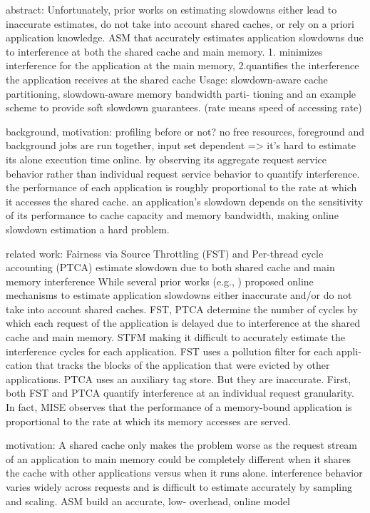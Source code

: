 \documentclass[UTF8]{article}
\begin{document}
abstract: Unfortunately, prior works on estimating slowdowns either lead to inaccurate estimates, do not take into account shared caches, or rely on a priori application knowledge. ASM that accurately estimates application slowdowns due to interference at both the shared cache and main memory.  1. minimizes interference for the application at the main memory, 2.quantifies the interference the application receives at the shared cache Usage: slowdown-aware cache partitioning, slowdown-aware memory bandwidth parti- tioning and an example scheme to provide soft slowdown guarantees. (rate means speed of accessing rate)

background, motivation: profiling before or not?  no free resources, foreground and background jobs are run together, input set dependent => it's hard to estimate its alone execution time online.   by observing its aggregate request service behavior rather than individual request service behavior to quantify interference.  the performance of each application is roughly proportional to the rate at which it accesses the shared cache.   an application’s slowdown depends on the sensitivity of its performance to cache capacity and memory bandwidth, making online slowdown estimation a hard problem.  

related work: Fairness via Source Throttling (FST) \cite{ebrahimi2010fairness}  and Per-thread cycle accounting (PTCA) \cite{du2013per} estimate slowdown due to both shared cache and main memory interference While several prior works (e.g., \cite{ebrahimi2010fairness,du2013per, mutlu2007stall,subramanian2013mise}) proposed online mechanisms to estimate application slowdowns either inaccurate and/or do not take into account shared caches. FST, PTCA determine the number of cycles by which each request of the application is delayed due to interference at the shared cache and main memory.   STFM \cite{mutlu2007stall} making it difficult to accurately estimate the interference cycles for each application. FST uses a pollution filter for each appli- cation that tracks the blocks of the application that were evicted by other applications. PTCA uses an auxiliary tag store. But they are inaccurate. First, both FST and PTCA quantify interference at an individual request granularity.  In fact, MISE \cite{subramanian2013mise} observes that the performance of a memory-bound application is proportional to the rate at which its memory accesses are served.

motivation: A shared cache only makes the problem worse as the request stream of an application to main memory could be completely different when it shares the cache with other applications versus when it runs alone.  interference behavior varies widely across requests and is difficult to estimate accurately by sampling and scaling. ASM build an accurate, low- overhead, online model
\end{document}
